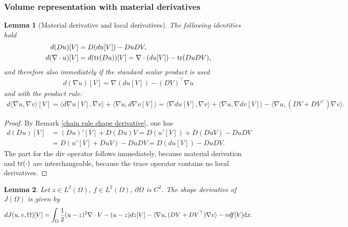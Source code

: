 \documentclass[oneside,11pt]{book}
\numberwithin{equation}{section}
\newtheorem{lemma}{Lemma}[section]
\begin{document}
\subsubsection{Volume representation with material derivatives}
\begin{lemma}[Material derivative and local derivatives]
    \label{Schmidt2020 Lemma 4.23}
    The following identities hold
    \begin{align}
        d(Du)[V] &= D(du[V]) - DuDV,\\
        d(\nabla\cdot u)[V] &= d({\rm tr}(Du))[V] = \nabla\cdot(du[V]) - {\rm tr}(DuDV),
    \end{align}
    and therefore also immediately if the standard scalar product is used
    \begin{align}
        \label{Schmidt2020 (4.13)}
        d(\nabla u)[V] = \nabla(du[V]) - (DV)^\top\nabla u
    \end{align}
    and with the product rule:
    \begin{align}
        \label{Schmidt2020 (4.14)}
        d\langle\nabla u,\nabla v\rangle[V] = \langle d\nabla u[V],\nabla v\rangle + \langle\nabla u,d\nabla v[V]\rangle = \langle\nabla du[V],\nabla v\rangle + \langle\nabla u,\nabla dv[V]\rangle - \langle\nabla u,(DV + DV^\top)\nabla v\rangle.
    \end{align}
\end{lemma}

\begin{proof}
    By Remark \ref{chain rule shape derivative}, one has
    \begin{align}
        d(Du)[V] &= (Du)'[V] + D(Du)V = D(u'[V]) + D(DuV) - DuDV\\
        &= D(u'[V] + DuV) - DuDV = D(du[V]) - DuDV.
    \end{align}
    The part for the div operator follows immediately, because material derivation and ${\rm tr}(\cdot)$ are interchangeable, because the trace operator contains no local derivatives.
\end{proof}

\begin{lemma}
    Let $z\in L^2(\Omega)$, $f\in L^2(\Omega)$, $\partial\Omega$ is $C^2$. The shape derivative of $J(\Omega)$ is given by
    \begin{align}
        \label{shape derivative: volume representation}
        dJ(u,v,\Omega)[V] = \int_\Omega \frac{1}{2}(u - z)^2\nabla\cdot V - (u - z)dz[V] - \langle\nabla u,(DV + DV^\top)\nabla v\rangle - vdf[V]{\rm d}x.
    \end{align} 
\end{lemma}
\end{document}
